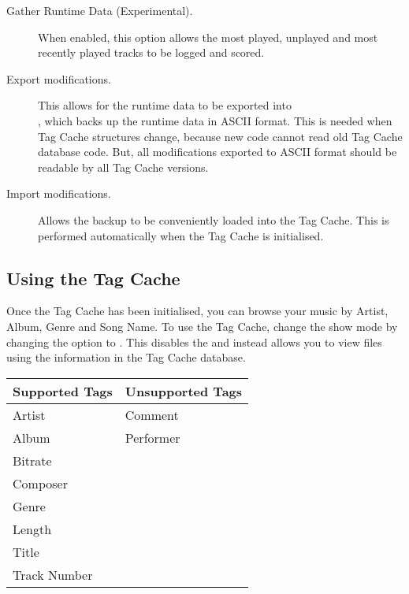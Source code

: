 \begin{description}
\item[Gather Runtime Data (Experimental).]
  When enabled, this option allows the most played, unplayed and most recently
  played tracks to be logged and scored.
  
\item[Export modifications.]
  This allows for the runtime data to be exported into \\
  , which backs up the runtime data in
  ASCII format. This is needed when Tag Cache structures change, because new
  code cannot read old Tag Cache database code. But, all modifications
  exported to ASCII format should be readable by all Tag Cache versions.
  
\item[Import modifications.]
  Allows the  backup to be 
  conveniently loaded into the Tag Cache. This is performed automatically when
  the Tag Cache is initialised.
  
\end{description}

\subsection{Using the Tag Cache}
Once the Tag Cache has been initialised, you can browse your music by Artist, 
Album, Genre and Song Name. To use the Tag Cache, change the 
 show mode by changing the  option to 
. This disables the  and instead
allows you to view files using the information in the Tag Cache database.\\

%
\begin{table}
\begin{center}
  \begin{tabularx}{.75\textwidth}{XX}%
  \toprule%
  \textbf{Supported Tags}   & \textbf{Unsupported Tags} \\
  \midrule
  Artist           & Comment \\
  Album            & Performer\\
  Bitrate          & \\
  Composer         & \\
  Genre            & \\
  Length           & \\
  Title            & \\
  Track Number     & \\
  \bottomrule
  \end{tabularx}
\end{center}
\end{table}
